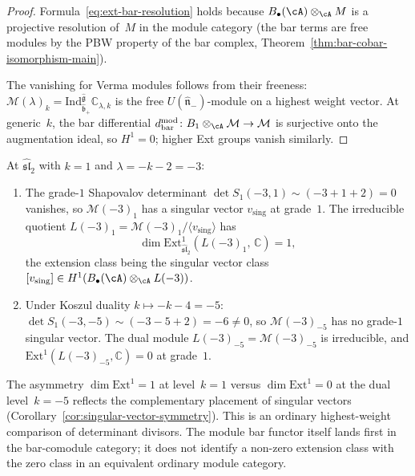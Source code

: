 \begin{proof}
Formula~\eqref{eq:ext-bar-resolution} holds because
$B_\bullet(\cA) \otimes_\cA M$ is a projective resolution of~$M$
in the module category (the bar terms are free modules by the
PBW property of the bar complex,
Theorem~\ref{thm:bar-cobar-isomorphism-main}).

The vanishing for Verma modules follows from their freeness:
$\mathcal{M}(\lambda)_k = \mathrm{Ind}_{\hat{\mathfrak{b}}_+}
^{\widehat{\mathfrak{g}}} \mathbb{C}_{\lambda,k}$
is the free $U(\hat{\mathfrak{n}}_-)$-module on a highest weight
vector. At generic~$k$, the bar differential
$d^{\mathrm{mod}}_{\mathrm{bar}}\colon B_1 \otimes_\cA \mathcal{M}
\to \mathcal{M}$ is surjective onto the augmentation ideal,
so $H^1 = 0$; higher Ext groups vanish similarly.
\end{proof}

\begin{example}
\label{ex:ext1-special-level}
At $\widehat{\mathfrak{sl}}_2$ with $k = 1$ and $\lambda = -k-2 = -3$:
\begin{enumerate}[label=\textup{(\roman*)}]
\item The grade-$1$ Shapovalov determinant
 $\det S_1(-3, 1) \sim (-3 + 1 + 2) = 0$ vanishes, so
 $\mathcal{M}(-3)_1$ has a singular vector
 $v_{\mathrm{sing}}$ at grade~$1$. The irreducible quotient
 $L(-3)_1 = \mathcal{M}(-3)_1 / \langle v_{\mathrm{sing}} \rangle$
 has
 \begin{equation}\label{eq:ext1-singular}
 \dim \mathrm{Ext}^1_{\widehat{\mathfrak{sl}}_2}(L(-3)_1,\,
 \mathbb{C}) = 1,
 \end{equation}
 the extension class being the singular vector class
 $[v_{\mathrm{sing}}] \in H^1(B_\bullet(\cA) \otimes_\cA L(-3))$.

\item Under Koszul duality $k \mapsto -k-4 = -5$:
 $\det S_1(-3, -5) \sim (-3 - 5 + 2) = -6 \neq 0$, so
 $\mathcal{M}(-3)_{-5}$ has no grade-$1$ singular vector.
 The dual module $L(-3)_{-5} = \mathcal{M}(-3)_{-5}$ is
 irreducible, and
 $\mathrm{Ext}^1(L(-3)_{-5}, \mathbb{C}) = 0$ at grade~$1$.
\end{enumerate}

The asymmetry $\dim \mathrm{Ext}^1 = 1$ at level~$k = 1$ versus
$\dim \mathrm{Ext}^1 = 0$ at the dual level~$k = -5$
reflects the complementary placement of singular vectors
(Corollary~\ref{cor:singular-vector-symmetry}). This is an ordinary
highest-weight comparison of determinant divisors. The module bar
functor itself lands first in the bar-comodule category; it does not
identify a non-zero extension class with the zero class in an
equivalent ordinary module category.
\end{example}

